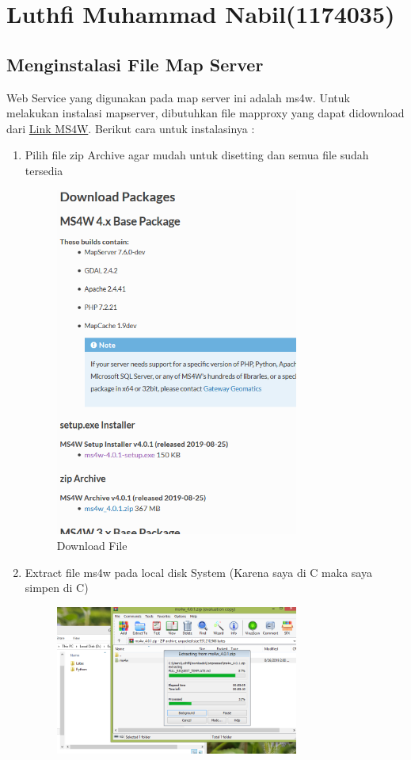 \section{Luthfi Muhammad Nabil(1174035)}
\subsection{Menginstalasi File Map Server}
Web Service yang digunakan pada map server ini adalah ms4w. Untuk melakukan instalasi mapserver, dibutuhkan file mapproxy yang dapat didownload dari \href{https://ms4w.com/}{Link MS4W}.
Berikut cara untuk instalasinya : 
\begin{enumerate}
    \item Pilih file zip Archive agar mudah untuk disetting dan semua file sudah tersedia
    \hfill\break
	\begin{figure}[H]
		\includegraphics[width=8cm]{figures/1174035/tugas4/mapserver_1.png}
		\centering
		\caption{Download File}
	\end{figure}
    \item Extract file ms4w pada local disk System (Karena saya di C maka saya simpen di C)
    \hfill\break
	\begin{figure}[H]
		\includegraphics[width=8cm]{figures/1174035/tugas4/mapserver_2.png}

\end{figure}
\end{enumerate}
